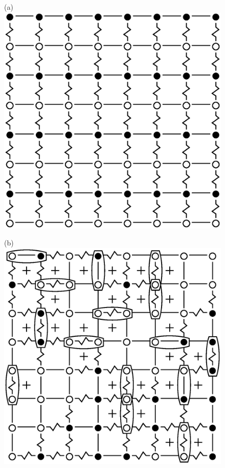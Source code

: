 \documentclass[preprint,12pt]{elsarticle}
\begin{document}
	\begin{figure}[H]
		\begin{minipage}[h]{0.3\linewidth}
			\centering(a)
			\includegraphics[width=1\linewidth]{pictures/SI_64_J0_1}
		\end{minipage}
		\hfill
		\begin{minipage}[h]{0.3\linewidth}
			\centering(b)
			\includegraphics[width=1\linewidth]{pictures/SG_64_J0}

\end{minipage}
\end{figure}
\end{document}
